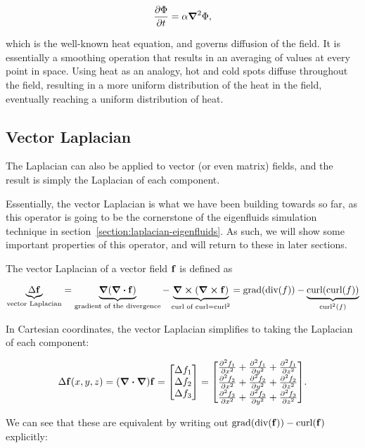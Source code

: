 $$
    \pdv{\Phi}{t} = \alpha \grad^2\Phi,
$$

which is the well-known heat equation, and governs diffusion of the field. It is
essentially a smoothing operation that results in an averaging of values at
every point in space. Using heat as an analogy, hot and cold spots diffuse
throughout the field, resulting in a more uniform distribution of the heat in
the field, eventually reaching a uniform distribution of heat.

\subsection*{Vector Laplacian}
\label{section:vector-laplacian}
The Laplacian can also be applied to vector (or even matrix) fields, and the
result is simply the Laplacian of each component.

Essentially, the vector Laplacian is what we have been building towards so far,
as this operator is going to be the cornerstone of the eigenfluids simulation
technique in section~\ref{section:laplacian-eigenfluids}. As such, we will show
some important properties of this operator, and will return to these in later
sections.

The vector Laplacian of a vector field $\vb{f}$ is defined as

$$\underbrace{\Delta \vb{f}}_{\text{vector Laplacian}}
= \underbrace{\grad(\div{\vb{f}})}_{\text{gradient of the divergence}}
- \underbrace{\curl(\curl{\vb{f}})}_{\text{curl of curl} = \text{curl}^2}
= \text{grad}(\text{div}(f))
- \underbrace{\text{curl}(\text{curl}(f))}_{\text{curl}^2(f)}$$

In Cartesian coordinates, the vector Laplacian simplifies to taking the
Laplacian of each component:

\begin{equation}
    \Delta\vb{f}(x, y, z) = (\grad\vdot\grad)\vb{f} = 
    \mqty[ \Delta f_1 \\ \Delta f_2 \\ \Delta f_3 ] =
    \mqty[
        \pdv[2]{f_1}{x} + \pdv[2]{f_1}{y} + \pdv[2]{f_1}{z}\\
        \pdv[2]{f_2}{x} + \pdv[2]{f_2}{y} + \pdv[2]{f_2}{z}\\
        \pdv[2]{f_3}{x} + \pdv[2]{f_3}{y} + \pdv[2]{f_3}{z}
    ].
    \label{eq:laplacian}
\end{equation}

We can see that these are equivalent by writing out
$\text{grad}(\text{div}(\vb{f})) - \text{curl}(\vb{f})$ explicitly:

